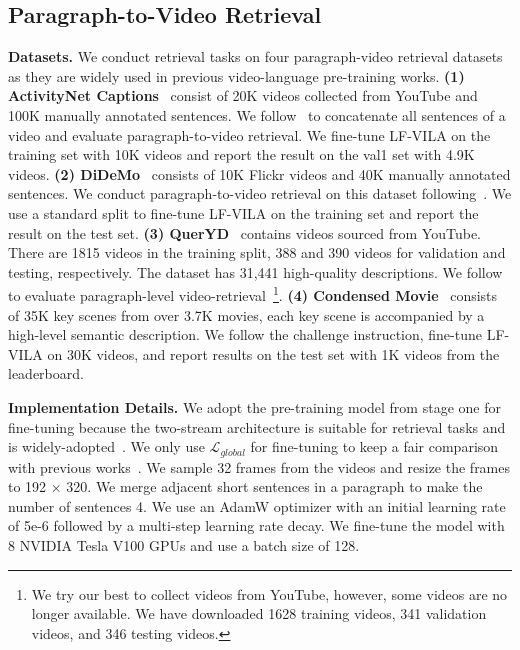 \documentclass{article}
\begin{document}
\subsection{Paragraph-to-Video Retrieval}
\textbf{Datasets.}
We conduct retrieval tasks on four paragraph-video retrieval datasets as they are widely used in previous video-language pre-training works.
\textbf{(1) ActivityNet Captions}~\cite{krishna2017actnetcaption} consist of 20K videos collected from YouTube and 100K manually annotated sentences. We follow~\cite{lei2021clipbert,xue2021hdvila,zhang2018hse} to concatenate all sentences of a video and evaluate paragraph-to-video retrieval. We fine-tune LF-VILA on the training set with 10K videos and report the result on the val1 set with 4.9K videos.
\textbf{(2) DiDeMo}~\cite{anne2017didemo} consists of 10K Flickr videos and 40K manually annotated sentences. We conduct paragraph-to-video retrieval on this dataset following~\cite{bain2021frozen,lei2021clipbert,xue2021hdvila}. We use a standard split to fine-tune LF-VILA on the training set and report the result on the test set.
\textbf{(3) QuerYD}~\cite{oncescu2021queryd} contains videos sourced from YouTube. There are 1815 videos in the training split, 388 and 390 videos for validation and testing, respectively. The dataset has 31,441 high-quality descriptions. We follow~\cite{croitoru2021teachtext,oncescu2021queryd} to evaluate paragraph-level video-retrieval~\footnote{We try our best to collect videos from YouTube, however, some videos are no longer available. We have downloaded 1628 training videos, 341 validation videos, and 346 testing videos.}.
\textbf{(4) Condensed Movie}~\cite{bain2020cmovie} consists of 35K key scenes from over 3.7K movies, each key scene is accompanied by a high-level semantic description. We follow the challenge instruction, fine-tune LF-VILA on 30K videos, and report results on the test set with 1K videos from the leaderboard.

\textbf{Implementation Details.}
We adopt the pre-training model from stage one for fine-tuning because the two-stream architecture is suitable for retrieval tasks and is widely-adopted~\cite{bain2021frozen,xue2021hdvila}. We only use $\mathcal{L}_{global}$ for fine-tuning to keep a fair comparison with previous works~\cite{bain2021frozen,xue2021hdvila}. We sample 32 frames from the videos and resize the frames to 192 × 320. We merge adjacent short sentences in a paragraph to make the number of sentences 4. We use an AdamW optimizer with an initial learning rate of 5e-6 followed by a multi-step learning rate decay. We fine-tune the model with 8 NVIDIA Tesla V100 GPUs and use a batch size of 128. 
\end{document}
